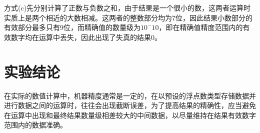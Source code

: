 \documentclass[11pt]{article}
\begin{document}
方式(c)先分别计算了正数与负数之和，由于结果是一个很小的数，这两者运算时实质上是两个相近的大数相减。这两者的整数部分均为7位，因此结果小数部分的有效部分最多只有9位，而精确值的数量级为$10^-10$，即在精确值精度范围内的有效数字均在运算中丢失，因此出现了失真的结果$0$。

\section{实验结论}
在实际的数值计算中，机器精度通常是一定的，在以预设的浮点数类型存储数据并进行数据之间的运算时，往往会出现截断误差，为了提高结果的精确性，应当避免在运算中出现和最终结果数量级相差较大的中间数据，以尽量维持在结果有效数字范围内的数据准确。
\end{document}
